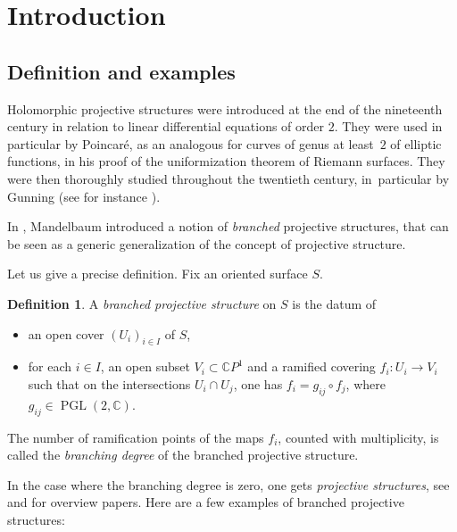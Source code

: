\documentclass[JEP,XML,SOM,Unicode,NoEqCountersInSection,published]{cedram}
\newcommand{\C}{\mathbb C}
\newcommand{\CP}{\mathbb CP}
\DeclareMathOperator{\PGL}{PGL}
\theoremstyle{definition}
\newtheorem*{definition*}{Definition}
\theoremstyle{plain}
\begin{document}
\maketitle
\vspace*{-.5\baselineskip}
\tableofcontents
\mainmatter
\vspace*{-2\baselineskip}\mbox{}

\section*{Introduction}

\subsection*{Definition and examples}

Holomorphic projective structures were introduced at the end of the nineteenth century in relation to linear differential equations of order $2$. They were used in particular by Poincaré, as an analogous for curves of genus at least~$2$ of elliptic functions, in his proof of the uniformization theorem of Riemann surfaces.
They were then thoroughly studied throughout the twentieth century, in~particular by Gunning (see for instance \cite{gunning}).

In \cite{mandelbaum_1}, Mandelbaum introduced a notion of \emph{branched} projective structures, that can be seen as a generic generalization of the concept of projective structure.

Let us give a precise definition.
Fix an oriented surface $S$.\enlargethispage{\baselineskip}%

\begin{definition*}
A \emph{branched projective structure} on $S$ is the datum of
\begin{itemize}
\item an open cover $(U_i)_{i \in I}$ of $S$,
\item for each $i \in I$, an open subset $V_i \subset \CP^1$ and a ramified covering $f_i: U_i \to V_i$ such that on the intersections $U_i \cap U_j$, one has $f_i = g_{ij} \circ f_j$, where $g_{ij} \in \PGL(2, \C)$.
\end{itemize}
The number of ramification points of the maps $f_i$, counted with multiplicity, is called the \emph{branching degree} of the branched projective structure.
\end{definition*}

In the case where the branching degree is zero, one gets \emph{projective structures}, see \cite{dumas} and \cite{loray-marin} for overview papers.
Here are a few examples of branched projective structures:
\end{document}
